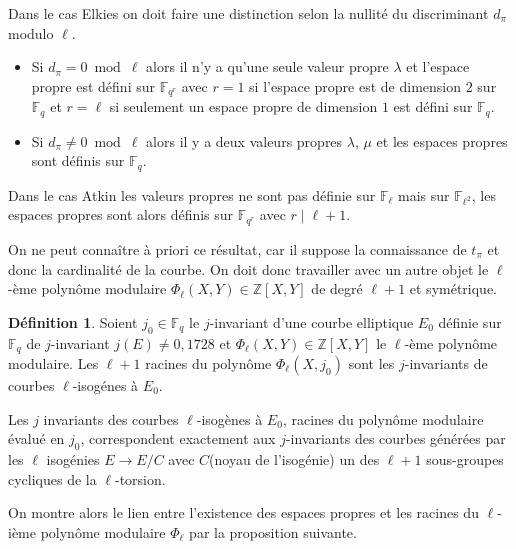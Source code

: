 \documentclass[10pt,a4paper]{book}
\theoremstyle{plain}
\theoremstyle{definition}
\theoremstyle{definition}
\theoremstyle{definition}
\theoremstyle{definition}
\newtheorem{defi}[thm]{Définition}
\theoremstyle{remark}
\theoremstyle{remark}
\theoremstyle{definition}
\begin{document}
	Dans le cas Elkies on doit faire une distinction selon la nullité du discriminant $d_{\pi}$ modulo $\ell$. 
\begin{itemize}	
	\item Si $d_{\pi}=0 \bmod \ell$ alors il n'y a qu'une seule valeur propre $\lambda$ et l'espace propre est défini sur $\mathbb{F}_{q^r}$ avec $r=1$ si l'espace propre est de dimension $2$ sur $\mathbb{F}_q$ et $r=\ell$ si seulement un espace propre de dimension $1$ est défini sur $\mathbb{F}_q$.
	\item Si $d_{\pi} \neq 0 \bmod \ell$ alors il y a deux valeurs propres $\lambda$, $\mu$ et les espaces propres sont définis sur $\mathbb{F}_q$.
\end{itemize}

	Dans le cas Atkin les valeurs propres ne sont pas définie sur $\mathbb{F}_\ell$ mais sur $\mathbb{F}_{\ell^2}$, les espaces propres sont alors définis sur $\mathbb{F}_{q^r}$ avec $r \mid \ell+1$.
	
	
	On ne peut connaître à priori ce résultat, car il suppose la connaissance de $t_{\pi}$ et donc la cardinalité de la courbe. On doit donc travailler avec un autre objet le $\ell$-ème polynôme modulaire $\Phi_{\ell}(X,Y) \in \mathbb{Z}[X,Y] $ de degré $\ell+1$ et symétrique. 
 
\begin{defi}
Soient $j_0 \in \mathbb{F}_q$ le $j$-invariant d'une courbe elliptique $E_0$ définie sur $\mathbb{F}_q$ de $j$-invariant $j(E) \neq 0,1728$ et  $\Phi_{\ell}(X,Y) \in \mathbb{Z}[X,Y] $ le $\ell$-ème polynôme modulaire. Les $\ell+1$ racines du polynôme $\Phi_{\ell}(X,j_0)$ sont les $j$-invariants de courbes $\ell$-isogénes à $E_0$. 
\end{defi} 
Les $j$ invariants des courbes $\ell$-isogènes à $E_0$, racines du polynôme modulaire évalué en $j_0$, correspondent exactement aux $j$-invariants des  courbes générées par les $\ell$ isogénies $E \to E/C$ avec $C$(noyau de l'isogénie) un des $\ell+1$ sous-groupes cycliques de la $\ell$-torsion. 

On montre alors le lien entre l'existence des espaces propres et les racines du $\ell$-ième polynôme modulaire $\Phi_{\ell}$ par la proposition suivante. 

 
 
 
\end{document}
